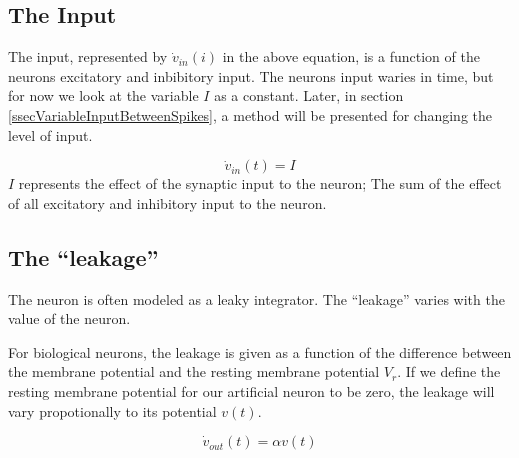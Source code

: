 \subsection{The Input}
The input, represented by $\dot{v}_{in}(i)$ in the above equation, is a function of the neurons excitatory and inbibitory input. 
The neurons input waries in time, but for now we look at the variable $I$ as a constant.
Later, in section \ref{ssecVariableInputBetweenSpikes}, a method will be presented for changing the level of input.  %

\begin{equation}
	\dot{v}_{in}(t) = I
\end{equation}
$I$ represents the effect of the synaptic input to the neuron; 
	The sum of the effect of all excitatory and inhibitory input to the neuron.



\subsection{The ``leakage''}
The neuron is often modeled as a leaky integrator. 
The ``leakage'' varies with the value of the neuron. %

For biological neurons, the leakage is given as a function of the difference between the membrane potential and the resting membrane potential $V_r$. 
If we define the resting membrane potential for our artificial neuron to be zero, the leakage will vary propotionally to its potential $v(t)$.

\begin{equation}
	\dot{v}_{out}(t) = \alpha v(t)
\end{equation}

